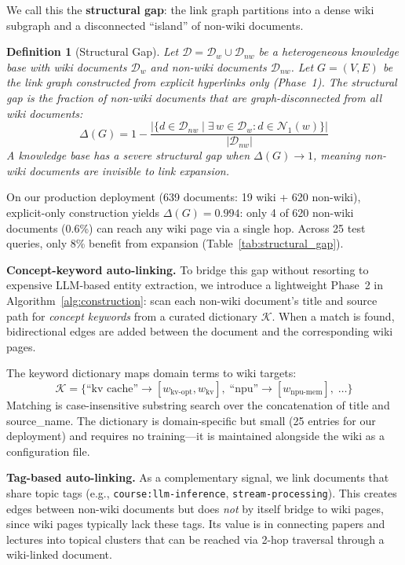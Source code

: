 \documentclass[sigconf,review]{acmart}
\newtheorem{definition}{Definition}
\begin{document}
We call this the \textbf{structural gap}: the link graph partitions into
a dense wiki subgraph and a disconnected ``island'' of non-wiki documents.

\begin{definition}[Structural Gap]
\label{def:structural_gap}
Let $\mathcal{D} = \mathcal{D}_w \cup \mathcal{D}_{nw}$ be a heterogeneous
knowledge base with wiki documents $\mathcal{D}_w$ and non-wiki documents
$\mathcal{D}_{nw}$.  Let $G = (V, E)$ be the link graph constructed from
explicit hyperlinks only (Phase~1).  The \emph{structural gap} is the
fraction of non-wiki documents that are graph-disconnected from all wiki
documents:
\[
  \Delta(G) = 1 - \frac{|\{d \in \mathcal{D}_{nw} \mid \exists\, w \in \mathcal{D}_w : d \in \mathcal{N}_1(w)\}|}{|\mathcal{D}_{nw}|}
\]
A knowledge base has a \emph{severe} structural gap when $\Delta(G) \to 1$,
meaning non-wiki documents are invisible to link expansion.
\end{definition}

On our production deployment (639 documents: 19 wiki + 620 non-wiki),
explicit-only construction yields $\Delta(G) = 0.994$: only 4 of 620
non-wiki documents (0.6\%) can reach any wiki page via a single hop.
Across 25 test queries, only 8\% benefit from expansion
(Table~\ref{tab:structural_gap}).

\textbf{Concept-keyword auto-linking.}
To bridge this gap without resorting to expensive LLM-based entity
extraction, we introduce a lightweight Phase~2 in
Algorithm~\ref{alg:construction}: scan each non-wiki document's title
and source path for \emph{concept keywords} from a curated dictionary
$\mathcal{K}$.  When a match is found, bidirectional edges are added
between the document and the corresponding wiki pages.

The keyword dictionary maps domain terms to wiki targets:
\[
  \mathcal{K} = \{\text{``kv cache''} \to [w_{\text{kv-opt}}, w_{\text{kv}}],\;
  \text{``npu''} \to [w_{\text{npu-mem}}],\;\ldots\}
\]
Matching is case-insensitive substring search over the concatenation of
title and source\_name.  The dictionary is domain-specific but small
(25 entries for our deployment) and requires no training---it is
maintained alongside the wiki as a configuration file.

\textbf{Tag-based auto-linking.}
As a complementary signal, we link documents that share topic tags
(e.g., \texttt{course:llm-inference}, \texttt{stream-processing}).
This creates edges between non-wiki documents but does \emph{not}
by itself bridge to wiki pages, since wiki pages typically lack these
tags.  Its value is in connecting papers and lectures into topical
clusters that can be reached via 2-hop traversal through a wiki-linked
document.
\end{document}
